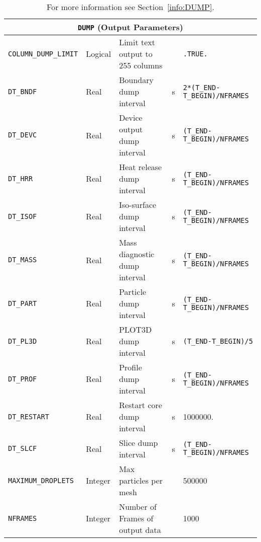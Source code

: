 \documentclass[11pt]{book}
\newcommand{\ct}{\tt\small}
\begin{document}
\begin{table}[H]
\caption{For more information see Section~\ref{info:DUMP}.}\label{tbl:DUMP}
\noindent
\begin{tabular*}{6.5in}{@{\extracolsep{\fill}}|l|l|l|l|l|}
\hline
\multicolumn{5}{|c|}{{\ct DUMP} (Output Parameters)} \\ \hline \hline
{\ct COLUMN\_DUMP\_LIMIT}       & Logical      & Limit text output to 255 columns  &           & {\ct .TRUE.}                      \\ \hline
{\ct DT\_BNDF}                  & Real         & Boundary dump interval            &  s        & {\ct 2*(T\_END-T\_BEGIN)/NFRAMES} \\ \hline
{\ct DT\_DEVC}                  & Real         & Device output dump interval       &  s        & {\ct (T\_END-T\_BEGIN)/NFRAMES}   \\ \hline
{\ct DT\_HRR}                   & Real         & Heat release dump interval        &  s        & {\ct (T\_END-T\_BEGIN)/NFRAMES}   \\ \hline
{\ct DT\_ISOF}                  & Real         & Iso-surface dump interval         &  s        & {\ct (T\_END-T\_BEGIN)/NFRAMES}   \\ \hline
{\ct DT\_MASS}                  & Real         & Mass diagnostic dump interval     &  s        & {\ct (T\_END-T\_BEGIN)/NFRAMES}   \\ \hline
{\ct DT\_PART}                  & Real         & Particle dump interval            &  s        & {\ct (T\_END-T\_BEGIN)/NFRAMES}   \\ \hline
{\ct DT\_PL3D}                  & Real         & PLOT3D dump interval              &  s        &{\ct (T\_END-T\_BEGIN)/5}          \\ \hline
{\ct DT\_PROF}                  & Real         & Profile dump interval             &  s        &{\ct (T\_END-T\_BEGIN)/NFRAMES}    \\ \hline
{\ct DT\_RESTART}               & Real         & Restart core dump interval        &  s        & 1000000.                          \\ \hline
{\ct DT\_SLCF}                  & Real         & Slice dump interval               &  s        &{\ct (T\_END-T\_BEGIN)/NFRAMES}    \\ \hline
{\ct MAXIMUM\_DROPLETS}         & Integer      & Max particles per mesh            &           & 500000                            \\ \hline
{\ct NFRAMES}                   & Integer      & Number of Frames of output data   &           & 1000                              \\ \hline

\end{tabular*}
\end{table}
\end{document}
